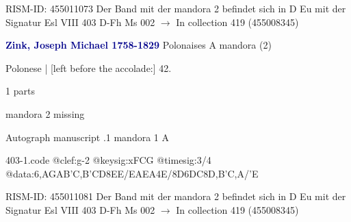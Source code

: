 \documentclass[twocolumn]{book}
\begin{document}
\newline RISM-ID: 455011073
\newline Der Band mit der mandora 2 befindet sich in D Eu mit der Signatur Esl VIII 403
\newline D-Fh  Ms 002
\newline $\rightarrow$ In collection 419 (455008345)

\newline \par \vspace{7pt} \textcolor{darkblue}{\textbf{Zink, Joseph Michael  1758-1829}}
\newline Polonaises  A  
\newline mandora (2)
\newline \begin{itshape}[f.24v, at left:] Polonese | [left before the accolade:] 42.\end{itshape} 
\newline \textcolor{darkblue}{}  1 parts  
\newline \begin{small} mandora 2 missing\end{small} 
\newline Autograph manuscript
.1  mandora 1  A  
\begin{filecontents*}{403-1.code}
@clef:g-2
@keysig:xFCG
@timesig:3/4
@data:{6,AGAB}{'C,B}{'CD}{8EE}/EAEA4E/{8D6DC}8D,B'C,A/'E
\end{filecontents*}
\newline
%

\newline RISM-ID: 455011081
\newline Der Band mit der mandora 2 befindet sich in D Eu mit der Signatur Esl VIII 403
\newline D-Fh  Ms 002
\newline $\rightarrow$ In collection 419 (455008345)
\end{document}
